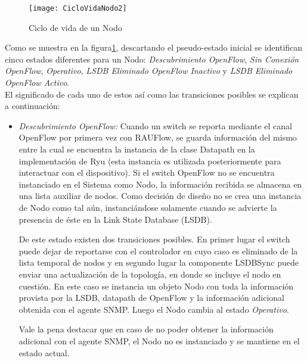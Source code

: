 \begin{figure}[ht!] 
\centering    
\texttt{[image: CicloVidaNodo2]}
\caption[Ciclo de vida de un Nodo]{Ciclo de vida de un Nodo}
\label{fig:CicloVidaNodo}
\end{figure}
  
Como se muestra en la figura\ref{fig:CicloVidaNodo}, descartando el pseudo-estado inicial se identifican cinco estados diferentes para un Nodo: \textit{Descubrimiento OpenFlow}, \textit{Sin Conexión OpenFlow}, \textit{Operativo}, \textit{LSDB Eliminado OpenFlow Inactivo} y \textit{LSDB Eliminado OpenFlow Activo}.\\

El significado de cada uno de estos as\'i como las transiciones posibles se explican a continuación:

\begin{itemize}
\item \textit{Descubrimiento OpenFlow:} Cuando un switch se reporta mediante el canal OpenFlow por primera vez con RAUFlow, se guarda informaci\'on del mismo entre la cual se encuentra la instancia de la clase Datapath en la implementaci\'on de Ryu (esta instancia es utilizada posteriormente para interactuar con el dispositivo). Si el switch OpenFlow no se encuentra instanciado en el Sistema como Nodo, la informaci\'on recibida se almacena en una lista auxiliar de nodos. Como decisión de diseño no se crea una instancia de Nodo como tal a\'un, instanci\'andose solamente cuando se advierte la presencia de \'este en la Link State Database (LSDB).


De este estado existen dos transiciones posibles. En primer lugar el switch puede dejar de reportarse con el controlador en cuyo caso es eliminado de la lista temporal de nodos y en segundo lugar la componente LSDBSync puede enviar una actualizaci\'on de la topolog\'ia, en donde se incluye el nodo en cuestión. En este caso se instancia un objeto Nodo con toda la informaci\'on provista por la LSDB, datapath de OpenFlow y la informaci\'on adicional obtenida con el agente SNMP. Luego el Nodo cambia al estado \textit{Operativo}.

Vale la pena destacar que en caso de no poder obtener la informaci\'on adicional con el agente SNMP, el Nodo no es instanciado y se mantiene en el estado actual.


\end{itemize}
